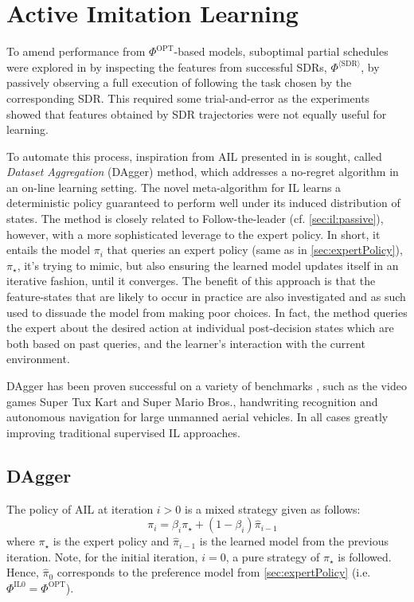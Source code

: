 \documentclass[twocolumn]{svjour3}
\begin{document}
\section{Active Imitation Learning}\label{sec:il:active}

To amend performance from $\Phi^{\text{OPT}}$-based models, suboptimal 
partial schedules were explored in \cite{InRu15a} by inspecting the features 
from successful SDRs, $\Phi^{\langle\text{SDR}\rangle}$, by passively observing 
a full execution of following the task chosen by the corresponding SDR. 
This required some trial-and-error as the experiments showed that features 
obtained by SDR trajectories were not equally useful for learning.

To automate this process, inspiration from AIL presented in \cite{RossGB11} is 
sought, called \emph{Dataset Aggregation} (DAgger) method, which addresses a 
no-regret algorithm in an on-line learning setting. 
The novel meta-algorithm for IL learns a deterministic policy guaranteed to 
perform well under its induced distribution of states. 
The method is closely related to Follow-the-leader (cf. 
\cref{sec:il:passive}), however, with a more sophisticated leverage to the 
expert policy. 
In short, it entails the model $\pi_i$ that queries an expert policy (same as 
in \cref{sec:expertPolicy}), $\pi_\star$, it's trying to mimic, 
but also ensuring the learned model updates itself in an iterative fashion, 
until it converges. 
The benefit of this approach is that the feature-states that are likely to 
occur in practice are also investigated and as such used to dissuade the model 
from making poor choices. In fact, the method queries the expert about the 
desired action at individual post-decision states which are both based on past 
queries, and the learner's interaction with the current environment.

DAgger has been proven successful on a variety of benchmarks 
\cite{RossGB11,Ross13}, such as the video games Super Tux Kart and Super 
Mario Bros., handwriting recognition and autonomous navigation for large 
unmanned aerial vehicles. In all cases greatly improving traditional supervised 
IL approaches.

\subsection{DAgger}
The policy of AIL at iteration $i>0$ is a mixed strategy given as follows:
\begin{equation}\quad\label{eq:il}
\pi_i = \beta_i\pi_\star + (1-\beta_i)\hat{\pi}_{i-1}
\end{equation}
where $\pi_\star$ is the expert policy and $\hat{\pi}_{i-1}$ is the learned 
model from the previous iteration. 
Note, for the initial iteration, $i=0$, a pure strategy of $\pi_\star$ is 
followed. Hence, $\hat{\pi}_0$ corresponds to the preference model from 
\cref{sec:expertPolicy} (i.e. $\Phi^{\text{IL}0}=\Phi^{\text{OPT}}$). 
\end{document}
